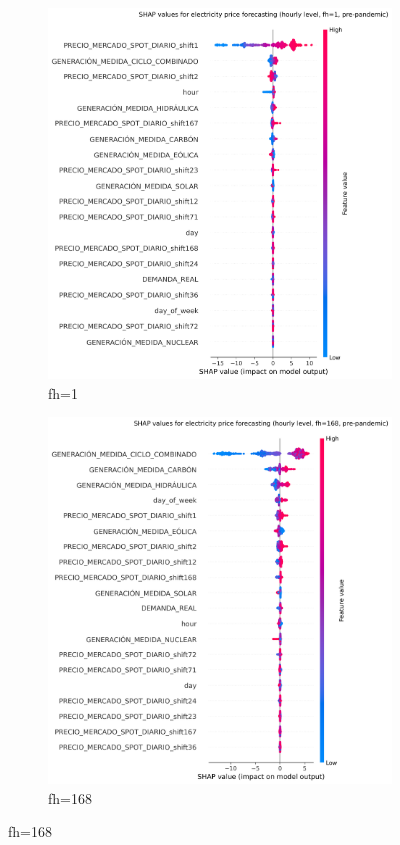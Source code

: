 \begin{figure}[H]
\centering
    \begin{subfigure}{.45\textwidth}
        \centering
        \includegraphics[width=1\linewidth]{images/analysis/shap-hourly-pre-1}
        \caption{fh=1}
    \end{subfigure}
    \begin{subfigure}{.45\textwidth}
        \centering
        \includegraphics[width=1\linewidth]{images/analysis/shap-hourly-pre-168}
        \caption{fh=168}
    \end{subfigure}


\end{figure}
